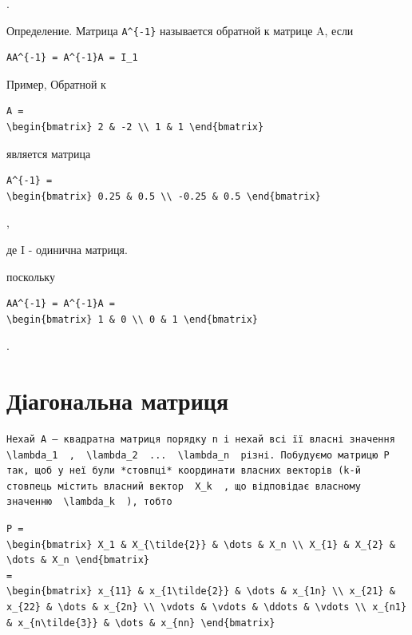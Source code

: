 \documentclass[
  ukrainian,
]{article}
\begin{document}
.

Определение. Матрица \texttt{A\^{}\{-1\}} называется обратной к матрице
A, если

\begin{verbatim}
AA^{-1} = A^{-1}A = I_1
\end{verbatim}

Пример, Обратной к

\begin{verbatim}
A =
\begin{bmatrix} 2 & -2 \\ 1 & 1 \end{bmatrix}
\end{verbatim}

является матрица

\begin{verbatim}
A^{-1} =
\begin{bmatrix} 0.25 & 0.5 \\ -0.25 & 0.5 \end{bmatrix}
\end{verbatim}

,

де I - одинична матриця.

поскольку

\begin{verbatim}
AA^{-1} = A^{-1}A =
\begin{bmatrix} 1 & 0 \\ 0 & 1 \end{bmatrix}
\end{verbatim}

.

\section{Діагональна
матриця}\label{ux434ux456ux430ux433ux43eux43dux430ux43bux44cux43dux430-ux43cux430ux442ux440ux438ux446ux44f}

\begin{verbatim}
Нехай A — квадратна матриця порядку n і нехай всі її власні значення  \lambda_1  ,  \lambda_2  ...  \lambda_n  різні. Побудуємо матрицю P так, щоб у неї були *стовпці* координати власних векторів (k-й стовпець містить власний вектор  X_k  , що відповідає власному значенню  \lambda_k  ), тобто
\end{verbatim}

\begin{verbatim}
P =
\begin{bmatrix} X_1 & X_{\tilde{2}} & \dots & X_n \\ X_{1} & X_{2} & \dots & X_n \end{bmatrix}
=
\begin{bmatrix} x_{11} & x_{1\tilde{2}} & \dots & x_{1n} \\ x_{21} & x_{22} & \dots & x_{2n} \\ \vdots & \vdots & \ddots & \vdots \\ x_{n1} & x_{n\tilde{3}} & \dots & x_{nn} \end{bmatrix}
\end{verbatim}
\end{document}
